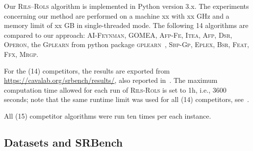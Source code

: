 \documentclass[a4paper,12pt]{elsarticle}
\begin{document}
Our \textsc{Rils}--\textsc{Rols} algorithm is implemented in Python version 3.x. The experiments concerning our method are performed on a machine xx with xx GHz and a memory limit of xx GB in single-threaded mode.  
The following 14 algorithms are compared to our approach: \textsc{AI-Feynman}, \textsc{GOMEA}, \textsc{Afp-Fe}, \textsc{Itea}, \textsc{Afp}, \textsc{Dsr}, \textsc{Operon}, the \textsc{Gplearn} from python package \textsc{gplearn}~\cite{stephens2016genetic}, \textsc{Sbp-Gp}, \textsc{Eplex}, \textsc{Bsr}, \textsc{Feat}, \textsc{Ffx}, \textsc{Mrgp}. 

For the (14) competitors, the results are exported from \url{https://cavalab.org/srbench/results/}, also reported in~\cite{la2021contemporary}. 
The maximum computation time allowed for each run of \textsc{Rils}-\textsc{Rols} is set to 1h, i.e., 3600 seconds; note that the same runtime limit was used for all (14) competitors, see~\cite{la2021contemporary}. 


All (15) competitor algorithms were run ten times per each instance.  


\subsection{Datasets and SRBench}
\end{document}

